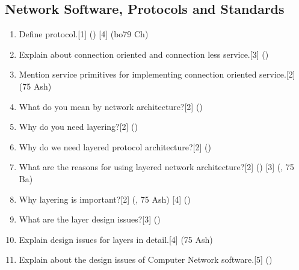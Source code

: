 \documentclass[12pt]{article}
\begin{document}
\subsection{Network Software, Protocols and Standards}
\begin{enumerate}[noitemsep, topsep = 0pt]
\item Define protocol.\hfill[1] () [4] (bo{79 Ch}) 

\item Explain about connection oriented and connection less service.\hfill[3] ()
\item Mention service primitives for implementing connection oriented service.\hfill[2] (75 Ash)
\item What do you mean by network architecture?\hfill[2] ()
\item Why do you need layering?\hfill[2] ()
\item Why do we need layered protocol architecture?\hfill[2] ()
\item What are the reasons for using layered network architecture?\hfill[2] () [3] (, 75 Ba)
\item Why layering is important?\hfill[2] (, 75 Ash) [4] ()
\item What are the layer design issues?\hfill[3] ()
\item Explain design issues for layers in detail.\hfill[4] (75 Ash)
\item Explain about the design issues of Computer Network software.\hfill[5] ()
\end{enumerate}
\end{document}
